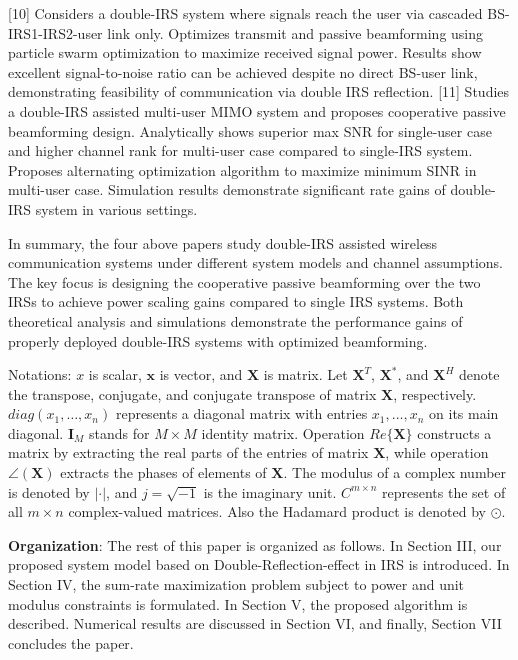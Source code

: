 \documentclass{article}
\newcommand{\vect}[1]{\mathbf{#1}} %
\newcommand{\mat}[1]{\mathbf{#1}} %
\begin{document}
[10] Considers a double-IRS system where signals reach the user via cascaded BS-IRS1-IRS2-user link only.
Optimizes transmit and passive beamforming using particle swarm optimization to maximize received signal power.
Results show excellent signal-to-noise ratio can be achieved despite no direct BS-user link, demonstrating feasibility of communication via double IRS reflection.
[11] Studies a double-IRS assisted multi-user MIMO system and proposes cooperative passive beamforming design. Analytically shows superior max SNR for single-user case and higher channel rank for multi-user case compared to single-IRS system. Proposes alternating optimization algorithm to maximize minimum SINR in multi-user case. Simulation results demonstrate significant rate gains of double-IRS system in various settings.
\par In summary, the four above papers study double-IRS assisted wireless communication systems under different system models and channel assumptions. The key focus is designing the cooperative passive beamforming over the two IRSs to achieve power scaling gains compared to single IRS systems. Both theoretical analysis and simulations demonstrate the performance gains of properly deployed double-IRS systems with optimized beamforming.

\par Notations: $x$ is scalar, $\vect{x}$ is vector, and $\mat{X}$ is matrix. Let $\mat{X}^T$, $\mat{X}^*$, and $\mat{X}^H$ denote the transpose, conjugate, and conjugate transpose of matrix $\mat{X}$, respectively. ${diag} (x_1, \ldots, x_n)$ represents a diagonal matrix with entries $x_1, \ldots, x_n$ on its main diagonal. $\mat{I}_M$ stands for $M \times M$ identity matrix. Operation ${Re}\{\mat{X}\}$ constructs a matrix by extracting the real parts of the entries of matrix $\mat{X}$, while operation $\angle(\mat{X})$ extracts the phases of elements of $\mat{X}$. The modulus of a complex number is denoted by $|\cdot|$, and $j = \sqrt{-1}$ is the imaginary unit. ${C}^{m \times n}$ represents the set of all $m \times n$ complex-valued matrices. Also the Hadamard product is denoted by $\odot$.
\par {\bf Organization}: The rest of this paper is organized as follows. 
In Section III, our proposed system model based on Double-Reflection-effect in IRS is introduced.
In Section IV, the sum-rate maximization problem subject to
power and unit modulus constraints is formulated.
In Section V, the proposed algorithm is described.
Numerical results are discussed in Section VI, and finally,
Section VII concludes the paper.
\end{document}
